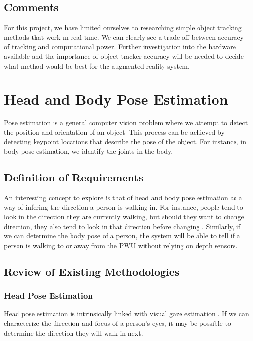 \subsection{Comments}
For this project, we have limited ourselves to researching simple object tracking methods that work in real-time. We can clearly see a trade-off between accuracy of tracking and computational power. Further investigation into the hardware available and the importance of object tracker accuracy will be needed to decide what method would be best for the augmented reality system.

\section{Head and Body Pose Estimation}
Pose estimation is a general computer vision problem where we attempt to detect the position and orientation of an object. This process can be achieved by detecting keypoint locations that describe the pose of the object. For instance, in body pose estimation, we identify the joints in the body.

\subsection{Definition of Requirements}
An interesting concept to explore is that of head and body pose estimation as a way of infering the direction a person is walking in. For instance, people tend to look in the direction they are currently walking, but should they want to change direction, they also tend to look in that direction before changing \cite{Valenti2012}. Similarly, if we can determine the body pose of a person, the system will be able to tell if a person is walking to or away from the PWU without relying on depth sensors.

\subsection{Review of Existing Methodologies}

\subsubsection{Head Pose Estimation}
Head pose estimation is intrinsically linked with visual gaze estimation \cite{Murphy-Chutorian2009}. If we can characterize the direction and focus of a person's eyes, it may be possible to determine the direction they will walk in next.


